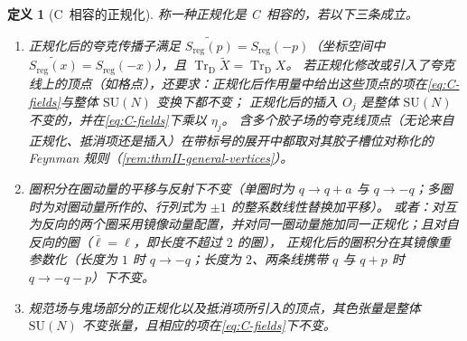 \documentclass[UTF8,a4paper,11pt,fontset=fandol]{ctexart}
\theoremstyle{cplain}
\theoremstyle{cdefinition}
\newtheorem{definition}[theorem]{定义}
\theoremstyle{cremark}
\numberwithin{equation}{section}
\newcommand{\TrD}{\operatorname{Tr}_{\mathrm{D}}}   %
\newcommand{\Cconj}[1]{\widetilde{#1}}              %
\begin{document}
\begin{definition}[C~相容的正规化]\label{def:reg-hypotheses}
称一种正规化是 C~相容的，若以下三条成立。
\begin{enumerate}[label=(R\arabic*),leftmargin=2.8em,itemsep=2pt,topsep=3pt]
\item 正规化后的夸克传播子满足 $\Cconj{S_{\mathrm{reg}}(p)}=S_{\mathrm{reg}}(-p)$（坐标空间中 $\Cconj{S_{\mathrm{reg}}(x)}=S_{\mathrm{reg}}(-x)$），且 $\TrD\Cconj X=\TrD X$。
      若正规化修改或引入了夸克线上的顶点（如格点），还要求：正规化后作用量中给出这些顶点的项在\cref{eq:C-fields}与整体 $\mathrm{SU}(N)$ 变换下都不变；
      正规化后的插入 $O_j$ 是整体 $\mathrm{SU}(N)$ 不变的，并在\cref{eq:C-fields}下乘以 $\eta_j$。
      含多个胶子场的夸克线顶点（无论来自正规化、抵消项还是插入）在带标号的展开中都取对其胶子槽位对称化的 Feynman 规则（\cref{rem:thmII-general-vertices}）。
\item 圈积分在圈动量的平移与反射下不变（单圈时为 $q\to q+a$ 与 $q\to-q$；多圈时为对圈动量所作的、行列式为 $\pm1$ 的整系数线性替换加平移）。
      或者：对互为反向的两个圈采用镜像动量配置，并对同一圈动量施加同一正规化；且对自反向的圈（$\bar\ell=\ell$，即长度不超过 $2$ 的圈），
      正规化后的圈积分在其镜像重参数化（长度为 $1$ 时 $q\to-q$；长度为 $2$、两条线携带 $q$ 与 $q+p$ 时 $q\to-q-p$）下不变。
\item 规范场与鬼场部分的正规化以及抵消项所引入的顶点，其色张量是整体 $\mathrm{SU}(N)$ 不变张量，且相应的项在\cref{eq:C-fields}下不变。
\end{enumerate}
\end{definition}
\end{document}
